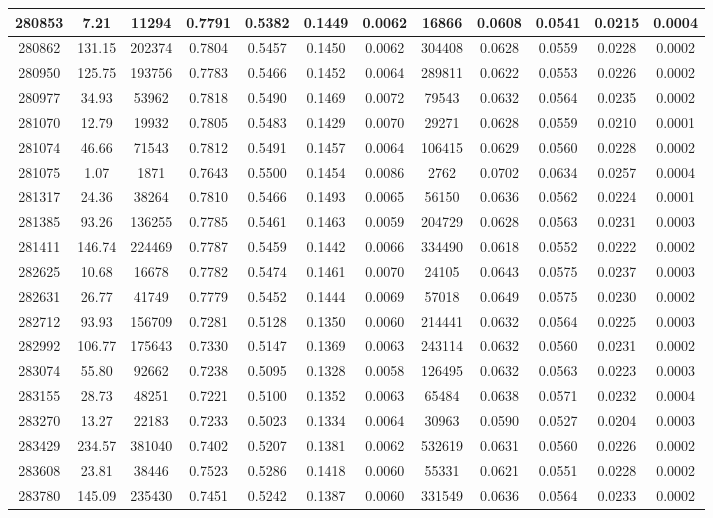 \documentclass[10pt]{extarticle}
\begin{document}
\begin{longtable}{|c|c|c|c|c|c|c|c|c|c|c|c|}
\hline 
280853&7.21&11294&0.7791&0.5382&0.1449&0.0062&16866&0.0608&0.0541&0.0215&0.0004 \\ 
\hline 
280862&131.15&202374&0.7804&0.5457&0.1450&0.0062&304408&0.0628&0.0559&0.0228&0.0002 \\ 
\hline 
280950&125.75&193756&0.7783&0.5466&0.1452&0.0064&289811&0.0622&0.0553&0.0226&0.0002 \\ 
\hline 
280977&34.93&53962&0.7818&0.5490&0.1469&0.0072&79543&0.0632&0.0564&0.0235&0.0002 \\ 
\hline 
281070&12.79&19932&0.7805&0.5483&0.1429&0.0070&29271&0.0628&0.0559&0.0210&0.0001 \\ 
\hline 
281074&46.66&71543&0.7812&0.5491&0.1457&0.0064&106415&0.0629&0.0560&0.0228&0.0002 \\ 
\hline 
281075&1.07&1871&0.7643&0.5500&0.1454&0.0086&2762&0.0702&0.0634&0.0257&0.0004 \\ 
\hline 
281317&24.36&38264&0.7810&0.5466&0.1493&0.0065&56150&0.0636&0.0562&0.0224&0.0001 \\ 
\hline 
281385&93.26&136255&0.7785&0.5461&0.1463&0.0059&204729&0.0628&0.0563&0.0231&0.0003 \\ 
\hline 
281411&146.74&224469&0.7787&0.5459&0.1442&0.0066&334490&0.0618&0.0552&0.0222&0.0002 \\ 
\hline 
282625&10.68&16678&0.7782&0.5474&0.1461&0.0070&24105&0.0643&0.0575&0.0237&0.0003 \\ 
\hline 
282631&26.77&41749&0.7779&0.5452&0.1444&0.0069&57018&0.0649&0.0575&0.0230&0.0002 \\ 
\hline 
282712&93.93&156709&0.7281&0.5128&0.1350&0.0060&214441&0.0632&0.0564&0.0225&0.0003 \\ 
\hline 
282992&106.77&175643&0.7330&0.5147&0.1369&0.0063&243114&0.0632&0.0560&0.0231&0.0002 \\ 
\hline 
283074&55.80&92662&0.7238&0.5095&0.1328&0.0058&126495&0.0632&0.0563&0.0223&0.0003 \\ 
\hline 
283155&28.73&48251&0.7221&0.5100&0.1352&0.0063&65484&0.0638&0.0571&0.0232&0.0004 \\ 
\hline 
283270&13.27&22183&0.7233&0.5023&0.1334&0.0064&30963&0.0590&0.0527&0.0204&0.0003 \\ 
\hline 
283429&234.57&381040&0.7402&0.5207&0.1381&0.0062&532619&0.0631&0.0560&0.0226&0.0002 \\ 
\hline 
283608&23.81&38446&0.7523&0.5286&0.1418&0.0060&55331&0.0621&0.0551&0.0228&0.0002 \\ 
\hline 
283780&145.09&235430&0.7451&0.5242&0.1387&0.0060&331549&0.0636&0.0564&0.0233&0.0002 \\ 

\end{longtable}
\end{document}
